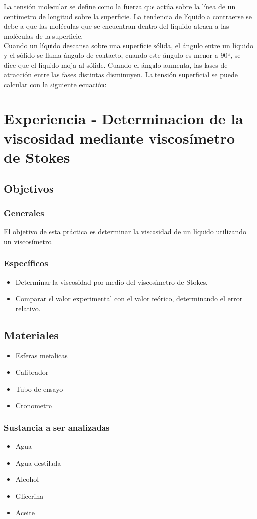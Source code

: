 \documentclass[11pt, letterpaper]{article}
\begin{document}
La  tensión  molecular  se  define  como  la  fuerza  que  actúa  sobre  la  línea  de  un centímetro de longitud sobre la superficie. La tendencia de líquido a contraerse se debe a que las moléculas que se encuentran dentro del líquido atraen a las moléculas de la superficie.\\

Cuando un líquido descansa sobre una superficie sólida, el ángulo entre un líquido y el  sólido  se  llama  ángulo  de  contacto,  cuando  este  ángulo  es  menor  a  90º,  se  dice que el líquido moja al sólido. Cuando el ángulo aumenta, las fases de atracción entre las fases distintas disminuyen. La tensión superficial se puede calcular con la siguiente ecuación:

\section{Experiencia - Determinacion de la viscosidad mediante  viscosímetro de Stokes}
\subsection{Objetivos}
\subsubsection{Generales}
El objetivo de esta práctica es determinar la viscosidad de un líquido
utilizando un viscosímetro.
\subsubsection{Específicos}
\begin{itemize}
\item Determinar la viscosidad por medio del viscosímetro de Stokes.
\item Comparar el valor experimental con el valor teórico, determinando el error relativo.
\end{itemize}
\subsection{Materiales}
\begin{itemize}
	\item Esferas metalicas
	\item Calibrador
	\item Tubo de ensayo
	\item Cronometro
\end{itemize}
\subsubsection{Sustancia a ser analizadas}
\begin{itemize}
	\item Agua
	\item Agua destilada
	\item Alcohol
	\item Glicerina
	\item Aceite
\end{itemize}
\end{document}
